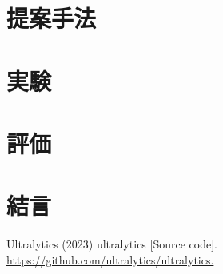 \documentclass[10pt]{jarticle}
\begin{document}
    \section{提案手法}%
     
    \section{実験}%

    \section{評価}%
      
    \section{結\hspace{2zw}言}%

    \vspace{1truemm}
    {\footnotesize
        \begin{thebibliography}{99}

            Ultralytics (2023) ultralytics [Source code]. \url{https://github.com/ultralytics/ultralytics.}
            
        \end{thebibliography}
    }
    \normalsize
    
\end{document}
